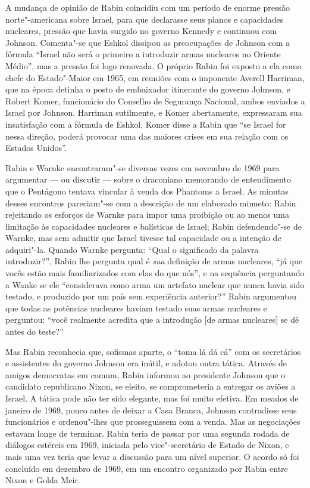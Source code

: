 A mudança de opinião de Rabin coincidiu com um período de enorme pressão
norte"-americana sobre Israel, para que declarasse seus planos e
capacidades nucleares, pressão que havia surgido no governo Kennedy e
continuou com Johnson. Comenta"-se que Eshkol dissipou as preocupações de
Johnson com a fórmula ``Israel não será o primeiro a introduzir armas
nucleares no Oriente Médio'', mas a pressão foi logo renovada. O próprio
Rabin foi exposto a ela como chefe do Estado"-Maior em 1965, em reuniões
com o imponente Averell Harriman, que na época detinha o posto de
embaixador itinerante do governo Johnson, e Robert Komer, funcionário do
Conselho de Segurança Nacional, ambos enviados a Israel por
Johnson. Harriman sutilmente, e Komer abertamente, expressaram sua
insatisfação com a fórmula de Eshkol. Komer disse a Rabin que ``se
Israel for nessa direção, poderá provocar uma das maiores crises em sua
relação com os Estados Unidos''.

Rabin e Warnke encontraram"-se diversas vezes em novembro de 1969 para
argumentar --- ou discutir --- sobre o draconiano memorando de
entendimento que o Pentágono tentava vincular à venda dos Phantoms a
Israel. As minutas desses encontros pareciam"-se com a descrição de um
elaborado minueto: Rabin rejeitando os esforços de Warnke para impor uma
proibição ou ao menos uma limitação às capacidades nucleares e
balísticas de Israel; Rabin defendendo"-se de Warnke, mas sem admitir que
Israel tivesse tal capacidade ou a intenção de adquiri"-la. Quando Warnke
pergunta: ``Qual o significado da palavra introduzir?'', Rabin lhe
pergunta qual é \textit{sua} definição de armas nucleares, ``já que
vocês estão mais familiarizados com elas do que nós'', e na sequência
perguntando a Wanke se ele ``considerava como arma um artefato nuclear
que nunca havia sido testado, e produzido por um país sem experiência
anterior?'' Rabin argumentou que todas as potências nucleares haviam
testado suas armas nucleares e perguntou: ``você realmente acredita que
a introdução {[}de armas nucleares{]} se dê antes do teste?''

Mas Rabin reconhecia que, sofismas aparte, o ``toma lá dá cá'' com os
secretários e assistentes do governo Johnson era inútil, e adotou outra
tática. Através de amigos democratas em comum, Rabin informou ao
presidente Johnson que o candidato republicano Nixon, se eleito, se
comprometeria a entregar os aviões a Israel. A tática pode não ter sido
elegante, mas foi muito efetiva. Em meados de janeiro de 1969, pouco
antes de deixar a Casa Branca, Johnson contradisse seus funcionários e
ordenou"-lhes que prosseguissem com a venda. Mas as negociações estavam
longe de terminar. Rabin teria de passar por uma segunda rodada de
diálogos estéreis em 1969, iniciada pelo vice"-secretário de Estado de
Nixon, e mais uma vez teria que levar a discussão para um nível
superior. O acordo só foi concluído em dezembro de 1969, em um encontro
organizado por Rabin entre Nixon e Golda Meir.

